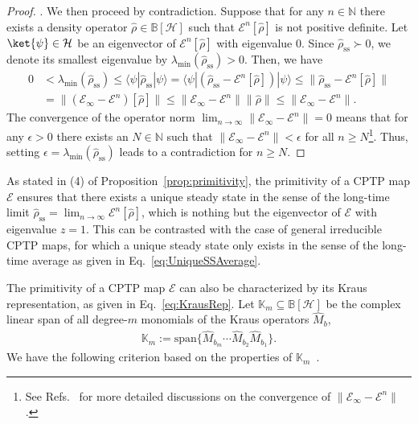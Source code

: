 \documentclass[preprint,pteplogo]{ptephy_v2}%
\numberwithin{equation}{section}
\theoremstyle{definition}
\newcommand{\mc}[1]{\mathcal{#1}}
\newcommand{\mbb}[1]{\mathbb{#1}}
\begin{document}
\begin{proof}
{}.
We then proceed by contradiction. 
Suppose that for any $n \in \mbb{N}$ there exists a density operator $\hat{\rho} \in \mbb{B}[\mc{H}]$ such that $\mc{E}^n[\hat{\rho}]$ is not positive definite.
Let $\ket{\psi} \in \mc{H}$ be an eigenvector of $\mc{E}^n[\hat{\rho}]$ with eigenvalue 0.
Since $\hat{\rho}_\mathrm{ss} \succ 0$, we denote its smallest eigenvalue by $\lambda_\textrm{min}(\hat{\rho}_\mathrm{ss}) > 0$.
Then, we have
\begin{align}
0 
&< \lambda_\textrm{min}(\hat{\rho}_\mathrm{ss}) 
\leq \langle \psi | \hat{\rho}_\mathrm{ss} | \psi \rangle
= \langle \psi | (\hat{\rho}_\mathrm{ss} - \mc{E}^n[\hat{\rho}]) | \psi \rangle 
\leq \| \hat{\rho}_\mathrm{ss} - \mc{E}^n[\hat{\rho}] \| \nonumber \\
&= \| (\mc{E}_\infty - \mc{E}^n)[\hat{\rho}] \|
\leq \| \mc{E}_\infty -\mc{E}^n \| \| \hat{\rho} \| \leq \| \mc{E}_\infty - \mc{E}^n \|.
\end{align}
The convergence of the operator norm $\lim_{n \to \infty} \| \mc{E}_\infty-\mc{E}^n \| = 0$ means that for any $\epsilon > 0$ there exists an $N \in \mbb{N}$ such that $\| \mc{E}_\infty-\mc{E}^n \| < \epsilon$ for all $n \geq N$\footnote{See Refs.~\cite{wolf2012quantum, szehr2015spectral} for more detailed discussions on the convergence of $\| \mc{E}_\infty - \mc{E}^n\|$.}.
Thus, setting $\epsilon = \lambda_\textrm{min}(\hat{\rho}_\mathrm{ss})$ leads to a contradiction for $n \geq N$.
\end{proof}

As stated in (4) of Proposition~\ref{prop:primitivity}, the primitivity of a CPTP map $\mc{E}$ ensures that there exists a unique steady state in the sense of the long-time limit $\hat{\rho}_\mathrm{ss} = \lim_{n \to \infty} \mc{E}^n[\hat{\rho}]$, which is nothing but the eigenvector of $\mc{E}$ with eigenvalue $z=1$.
This can be contrasted with the case of general irreducible CPTP maps, for which a unique steady state only exists in the sense of the long-time average as given in Eq.~\eqref{eq:UniqueSSAverage}.

The primitivity of a CPTP map $\mc{E}$ can also be characterized by its Kraus representation, as given in Eq.~\eqref{eq:KrausRep}.
Let $\mbb{K}_m \subseteq \mbb{B}[\mc{H}]$ be the complex linear span of all degree-$m$ monomials of the Kraus operators $\hat{M}_b$, 
\begin{align}
\mbb{K}_m := \textrm{span} \{ \hat{M}_{b_m} \cdots \hat{M}_{b_2} \hat{M}_{b_1} \}.
\end{align}
We have the following criterion based on the properties of $\mbb{K}_m$~\cite{sanz2010quantum, wolf2012quantum}.
\end{document}
